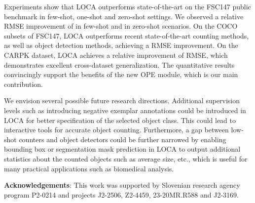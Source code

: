 \documentclass[10pt,twocolumn,letterpaper]{article}
\begin{document}
Experiments show that LOCA outperforms state-of-the-art on the FSC147 public benchmark in few-shot, one-shot and zero-shot settings. 
We observed 
a relative RMSE improvement of  in few-shot and  in zero-shot scenarios.
On the COCO subsets of FSC147, LOCA outperforms recent state-of-the-art counting methods, as well as object detection methods, achieving a  RMSE improvement. 
On the CARPK dataset, LOCA achieves a relative improvement of  RMSE, which demonstrates excellent cross-dataset generalization. 
The quantitative results convincingly support the benefits of the new OPE module, which is our main contribution.

We envision several possible future research directions. 
Additional supervision levels such as introducing negative exemplar annotations could be introduced in LOCA for better specification of the selected object class. 
This could lead to interactive tools for accurate object counting. Furthermore, a gap between low-shot counters and object detectors could be further narrowed by enabling bounding box or segmentation mask prediction in LOCA to output additional statistics about the counted objects such as average size, etc., which is useful for many practical applications such as biomedical analysis.
 















\hfill 

{\noindent \bf Acknowledgements}:
This work was supported by Slovenian research agency program 
P2-0214 and projects 
J2-2506, Z2-4459, 23-20MR.R588 and 
J2-3169. 


{\small


}
\end{document}
